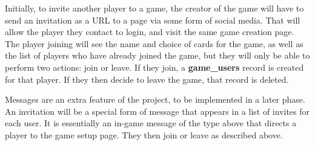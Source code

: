 Initially, to invite another player to a game, the creator of the game will have to send an invitation as a URL to a page via some form of social media. That will allow the player they contact to login, and visit the same game creation page. The player joining will see the name and choice of cards for the game, as well as the list of players who have already joined the game, but they will only be able to perform two actions: join or leave. If they join, a \textbf{game\_users} record is created for that player. If they then decide to leave the game, that record is deleted.

Messages are an extra feature of the project, to be implemented in a later phase. An invitation will be a special form of message that appears in a list of invites for each user. It is essentially an in-game message of the type above that directs a player to the game setup page. They then join or leave as described above.

